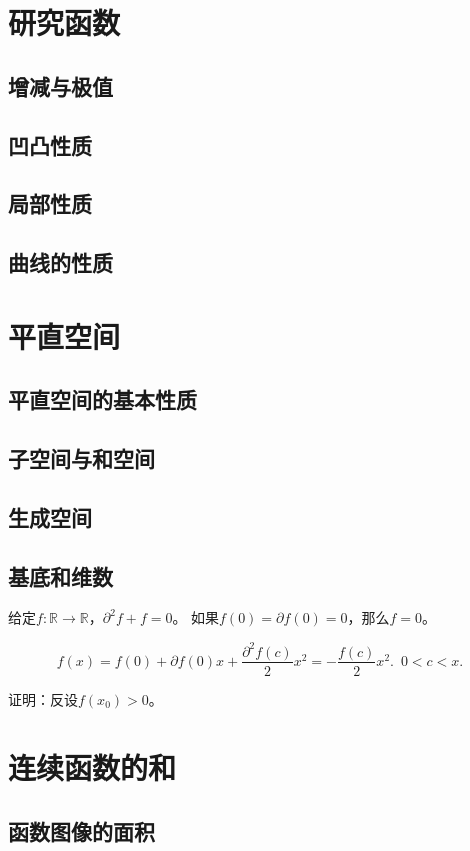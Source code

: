 \documentclass[12pt,UTF8]{ctexbook}
\begin{document}
\chapter{研究函数}
\section{增减与极值}
\section{凹凸性质}
\section{局部性质}
\section{曲线的性质}

\chapter{平直空间}
\section{平直空间的基本性质}
\section{子空间与和空间}
\section{生成空间}
\section{基底和维数}

给定$f:\mathbb{R} \rightarrow \mathbb{R}$，$\partial^2 f + f = 0$。
如果$f(0) = \partial f(0) = 0$，那么$f = 0$。

$$ f(x) = f(0) + \partial f(0) x + \frac{\partial^2 f (c)}{2}x^2 = -\frac{f (c)}{2}x^2. \,\,\, 0 < c < x. $$

证明：反设$f(x_0) > 0$。

\chapter{连续函数的和}
\section{函数图像的面积}
\end{document}
